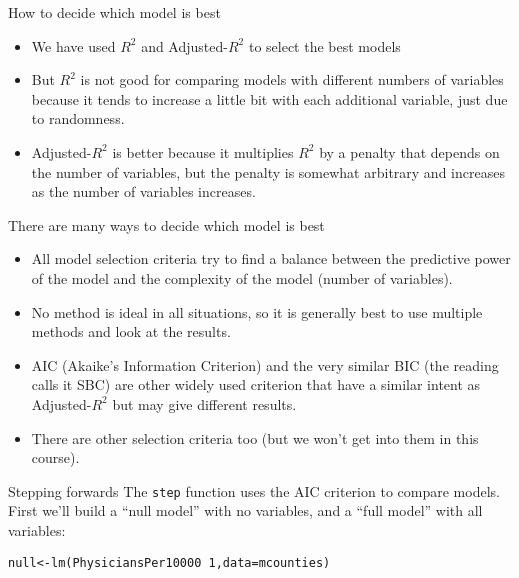 \documentclass{beamer}\usepackage[]{graphicx}\usepackage[]{color}
\makeatletter
\newcommand{\hlnum}[1]{\textcolor[rgb]{0.824,0.412,0.118}{#1}}%
\newcommand{\hlopt}[1]{\textcolor[rgb]{1,0.894,0.769}{#1}}%
\newcommand{\hlstd}[1]{\textcolor[rgb]{1,0.894,0.769}{#1}}%
\newcommand{\hlkwb}[1]{\textcolor[rgb]{0.804,0.776,0.451}{#1}}%
\newcommand{\hlkwc}[1]{\textcolor[rgb]{0.78,0.941,0.545}{#1}}%
\newcommand{\hlkwd}[1]{\textcolor[rgb]{1,0.78,0.769}{#1}}%
\newenvironment{kframe}{%
 \def\at@end@of@kframe{}%
 \ifinner\ifhmode%
  \def\at@end@of@kframe{\end{minipage}}%
  \begin{minipage}{\columnwidth}%
 \fi\fi%
 \def\FrameCommand##1{\hskip\@totalleftmargin \hskip-\fboxsep
 \colorbox{shadecolor}{##1}\hskip-\fboxsep
     \hskip-\linewidth \hskip-\@totalleftmargin \hskip\columnwidth}%
 \MakeFramed {\advance\hsize-\width
   \@totalleftmargin\z@ \linewidth\hsize
   \@setminipage}}%
 {\par\unskip\endMakeFramed%
 \at@end@of@kframe}
\newenvironment{knitrout}{}{} %
\makeatother
\begin{document}
\begin{darkframes}
    \begin{frame}{How to decide which model is best}
      \begin{itemize}[<+->]
        \item We have used $R^2$ and Adjusted-$R^2$ to select the best models
        \item But $R^2$ is not good for comparing models with different numbers of variables because it tends to increase a little bit with each additional variable, just due to randomness.
        \item Adjusted-$R^2$ is better because it multiplies $R^2$ by a penalty that depends on the number of variables, but the penalty is somewhat arbitrary and increases as the number of variables increases.
      \end{itemize} 
    \end{frame}


    \begin{frame}{There are many ways to decide which model is best}
      \begin{itemize}[<+->]
        \item All model selection criteria try to find a balance between the \alert{predictive power of the model} and the \alert{complexity of the model} (number of variables).
        \item No method is ideal in all situations, so it is generally best to use multiple methods and look at the results.
        \item AIC (Akaike's Information Criterion) and the very similar BIC (the reading calls it SBC) are other widely used criterion that have a similar intent as Adjusted-$R^2$ but may give different results.
        \item There are other selection criteria too (but we won't get into them in this course).
      \end{itemize} 
    \end{frame}

    \begin{frame}[fragile]{Stepping forwards}
       The \texttt{step} function uses the AIC criterion to compare models. First we'll build a ``null model'' with no variables, and a ``full model'' with all variables:

      \fontsize{9}{9}\selectfont
\begin{knitrout}
\begin{kframe}
\begin{alltt}
\hlstd{null} \hlkwb{<-} \hlkwd{lm}\hlstd{(PhysiciansPer10000} \hlopt{~} \hlnum{1}\hlstd{,} \hlkwc{data}\hlstd{=mcounties)}


\end{alltt}
\end{kframe}
\end{knitrout}
\end{frame}
\end{darkframes}
\end{document}
